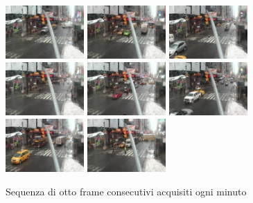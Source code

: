 \begin{figure}[tb]
	\centering
	\includegraphics[width=3cm]{./pictures/image0001.eps}
	\includegraphics[width=3cm]{./pictures/image0002.eps}
	\includegraphics[width=3cm]{./pictures/image0003.eps}
	\includegraphics[width=3cm]{./pictures/image0004.eps}
	\includegraphics[width=3cm]{./pictures/image0005.eps}
	\includegraphics[width=3cm]{./pictures/image0006.eps}
	\includegraphics[width=3cm]{./pictures/image0007.eps}
	\includegraphics[width=3cm]{./pictures/image0008.eps}
	\caption{Sequenza di otto frame consecutivi acquisiti ogni minuto}
	\label{fig:framDifferences}
\end{figure}
